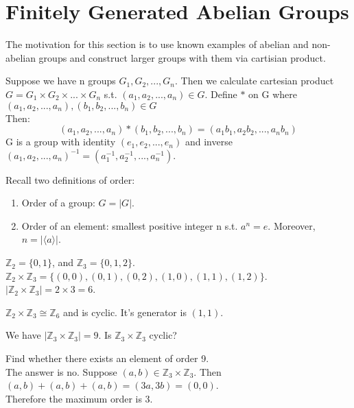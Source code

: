 \section{Finitely Generated Abelian Groups}

\begin{note}
    The motivation for this section is to use known examples of abelian and non-abelian groups and construct larger groups with them via cartisian product.
\end{note}

\begin{theorem}
    Suppose we have n groups $G_1, G_2, ..., G_n$. Then we calculate cartesian product $G = G_1 \times G_2 \times ... \times G_n$ s.t. $(a_1, a_2, ..., a_n) \in G$.
    Define $\ast$ on G where $(a_1, a_2, ..., a_n),(b_1, b_2, ..., b_n) \in G$\\ 
    Then: \[(a_1, a_2, ..., a_n) \ast (b_1, b_2, ..., b_n) = (a_1 b_1, a_2 b_2, ..., a_n b_n)\]
    G is a group with identity $(e_1, e_2, ..., e_n)$ and inverse $(a_1, a_2, ..., a_n)^{-1} = (a_1^{-1}, a_2^{-1}, ..., a_n^{-1})$.
\end{theorem}

\begin{prev}
    Recall two definitions of order:
    \begin{enumerate}
        \item Order of a group: $G = |G|$.
        \item Order of an element: smallest positive integer n s.t. $a^n = e$.
        Moreover, $n = |\langle a \rangle|$.
    \end{enumerate}
\end{prev}

\begin{eg}
$\mathbb{Z}_2 = \{0, 1\}$, and $\mathbb{Z}_3 = \{0, 1, 2\}$.\\
$\mathbb{Z}_2 \times \mathbb{Z}_3 = \{(0, 0), (0, 1), (0, 2), (1, 0), (1, 1), (1, 2)\}$.\\
$| \mathbb{Z}_2 \times \mathbb{Z}_3 | = 2 \times 3 = 6$.\\
\end{eg}

\begin{remark}
    $\mathbb{Z}_2 \times \mathbb{Z}_3 \cong \mathbb{Z}_6$ and is cyclic.
    It's generator is $(1, 1)$.
\end{remark}

\begin{exercise}
    We have $|\mathbb{Z}_3 \times \mathbb{Z}_3| = 9$. Is $\mathbb{Z}_3 \times \mathbb{Z}_3$ cyclic?
\end{exercise}
\begin{answer}
    Find whether there exists an element of order 9.\\
    The answer is no. Suppose $(a, b) \in \mathbb{Z}_3 \times \mathbb{Z}_3$. Then $(a, b) + (a, b) + (a, b) = (3a, 3b) = (0, 0)$.\\
    Therefore the maximum order is 3.
\end{answer}

